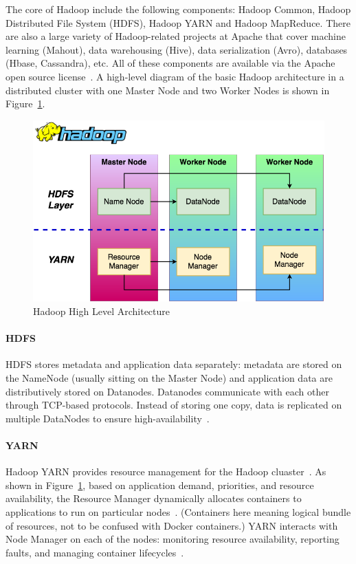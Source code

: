 The core of Hadoop include the following components: Hadoop Common,
Hadoop Distributed File System (HDFS), Hadoop YARN and Hadoop
MapReduce. There are also a large variety of Hadoop-related projects
at Apache that cover machine learning (Mahout), data warehousing
(Hive), data serialization (Avro), databases (Hbase, Cassandra),
etc. All of these components are available via the Apache open source
license~\cite{hid-sp18-405-hadoop-official}. A high-level diagram of
the basic Hadoop architecture in a distributed cluster with one Master
Node and two Worker Nodes is shown in Figure~\ref{f:hadoop-high}.

\begin{figure}[!ht]
	\centering\includegraphics[width=\columnwidth]{images/hadoop.png}
	 \caption{Hadoop High Level 
	 Architecture~\cite{hid-sp18-405-hadoop-wiki}}\label{f:hadoop-high}
\end{figure}

\paragraph{HDFS} HDFS stores metadata and 
application data separately: metadata are stored on the NameNode
(usually sitting on the Master Node) and application data are
distributively stored on Datanodes. Datanodes communicate with each
other through TCP-based protocols. Instead of storing one copy, data
is replicated on multiple DataNodes to ensure
high-availability~\cite{hid-sp18-405-shvachko2010hdfs}.

\paragraph{YARN} Hadoop YARN provides resource management for the 
Hadoop cluaster~\cite{hid-sp18-405-hadoop-official}. As shown in
Figure~\ref{f:hadoop-high}, based on application demand, priorities,
and resource availability, the Resource Manager dynamically allocates
containers to applications to run on particular
nodes~\cite{hid-sp18-405-vavi2013yarn}. (Containers here meaning
logical bundle of resources, not to be confused with Docker
containers.) YARN interacts with Node Manager on each of the nodes:
monitoring resource availability, reporting faults, and managing
container lifecycles~\cite{hid-sp18-405-vavi2013yarn}.

